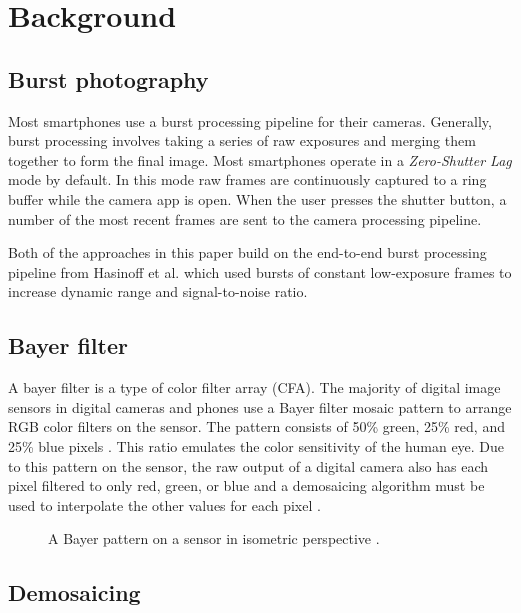 \documentclass{sig-alternate}
\begin{document}
\section{Background}

\subsection{Burst photography}

Most smartphones use a burst processing pipeline for their cameras. Generally, burst processing involves taking a series of raw exposures and merging them together to form the final image. Most smartphones operate in a \emph{Zero-Shutter Lag} mode by default. In this mode raw frames are continuously captured to a ring buffer while the camera app is open. When the user presses the shutter button, a number of the most recent frames are sent to the camera processing pipeline.

Both of the approaches in this paper build on the end-to-end burst processing pipeline from Hasinoff et al. \cite{Hasinoff2016} which used bursts of constant low-exposure frames to increase dynamic range and signal-to-noise ratio.

\newpage

\subsection{Bayer filter}

A bayer filter is a type of color filter array (CFA). The majority of digital image sensors in digital cameras and phones use a Bayer filter mosaic pattern to arrange RGB color filters on the sensor. The pattern consists of 50\% green, 25\% red, and 25\% blue pixels \cite{wiki:BayerFilter}. This ratio emulates the color sensitivity of the human eye. Due to this pattern on the sensor, the raw output of a digital camera also has each pixel filtered to only red, green, or blue and a demosaicing algorithm must be used to interpolate the other values for each pixel \cite{wiki:BayerFilter}.

\begin{figure}
\centering
{}
\caption{A Bayer pattern on a sensor in isometric perspective \cite{wiki:BayerFilter}.}
\label{fig:BayerPattern}
\end{figure}

\subsection{Demosaicing}
\end{document}

